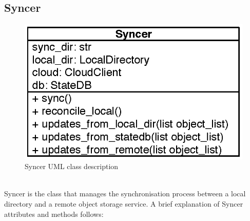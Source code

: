   \subsection{Syncer}
    \begin{figure}[!htpb]
      \centering
      \includegraphics{Images/Syncer.eps}
      \caption{Syncer UML class description}
      \label{fig:syncer_uml}
    \end{figure}\\
    Syncer is the class that manages the synchronisation process between a local directory and a remote object storage service. A brief explanation of Syncer attributes and methods follows:
